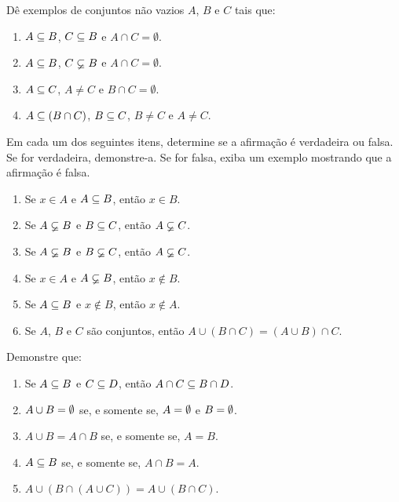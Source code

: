 \documentclass[12pt]{exam}
\begin{document}
    \questao{} D\^e exemplos de conjuntos n\~ao vazios $A$, $B$ e $C$ tais que:
    \begin{enumerate}[label={\alph*})]
        \item $A \subseteq B$, $C \subseteq B$ e $A \cap C = \emptyset$.
        \item $A \subseteq B$, $C \varsubsetneq B$ e $A \cap C = \emptyset$.
        \item $A \subseteq C$, $A \ne C$ e $B \cap C = \emptyset$.
        \item $A \subseteq (B \cap C)$, $B \subseteq C$, $B \ne C$ e $A \ne C$.
    \end{enumerate}

    \vspace{.3cm}

    \questao{} Em cada um dos seguintes itens, determine se a afirma\c{c}\~ao \'e
    verdadeira ou falsa. Se for verdadeira, demonstre-a. Se for falsa, exiba um
    exemplo mostrando que a afirma\c{c}\~ao \'e falsa.
    \begin{enumerate}[label={\alph*})]
    \item Se $x \in A$ e $A \subseteq B$, ent\~ao $x \in B$.

    \item Se $A \varsubsetneq B$ e $B \subseteq C$, ent\~ao $A \varsubsetneq C$.

    \item Se $A \varsubsetneq B$ e $B \varsubsetneq C$, ent\~ao $A \varsubsetneq C$.

    \item Se $x \in A$ e $A \varsubsetneq B$, ent\~ao $x \notin B$.

    \item Se $A \subseteq B$ e $x \notin B$, ent\~ao $x \notin A$.

    \item Se $A$, $B$ e $C$ s\~ao conjuntos, ent\~ao $A \cup (B \cap C) = (A \cup B) \cap C$.
    \end{enumerate}

    \questao{} Demonstre que:
    \begin{enumerate}[label={\alph*})]
        \item Se $A \subseteq B$ e $C \subseteq D$, ent\~ao $A \cap C \subseteq B \cap D$.

        \item $A \cup B = \emptyset$ se, e somente se, $A = \emptyset$ e $B = \emptyset$.

        \item $A \cup B = A \cap B$ se, e somente se,  $A = B$.

        \item $A \subseteq B$ se, e somente se,  $A \cap B = A$.

        \item $A \cup (B \cap (A \cup C)) = A \cup (B \cap C)$.
    \end{enumerate}
\end{document}
